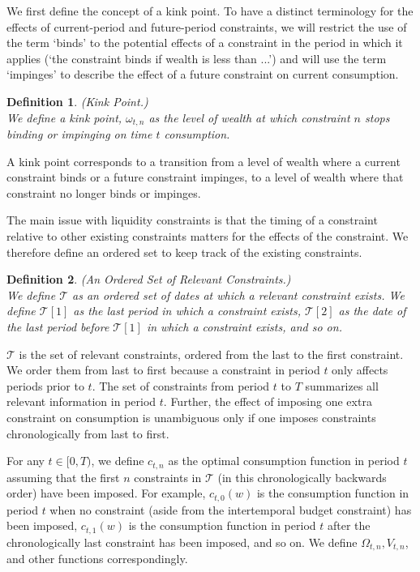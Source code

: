 \documentclass[titlepage]{\econtex}
\providecommand{\wAlt}{\omega}
\newtheorem{defn}{Definition}
\begin{document}
  We first define the concept of a kink point. To have a distinct terminology for the effects of current-period and future-period constraints, we will restrict the use of the term `binds' to the potential effects of a constraint in the period in which it applies (`the constraint binds if wealth is less than ...') and will use the term `impinges' to describe the effect of a future constraint on current consumption. 
  \begin{defn}(Kink Point.) \\
    We define a kink point, $\wAlt_{t,n}$ as the level of wealth at which constraint $n$ stops binding or impinging on time $t$ consumption.
  \end{defn}
  \noindent A kink point corresponds to a transition from a level of wealth where a current constraint binds or a future constraint impinges, to a level of wealth where that constraint no longer binds or impinges. 





  The main issue with liquidity constraints is that the timing of a constraint relative to  other existing constraints matters for the effects of the constraint. We therefore define an ordered set to keep track of the existing constraints.
  \begin{defn} (An Ordered Set of Relevant Constraints.) \\
    We define $\mathcal{T}$ as an ordered set of dates at which a relevant constraint exists. We define $\mathcal{T}[1]$ as the last period in which a constraint exists, $\mathcal{T}[2]$ as the date of the last period before $\mathcal{T}[1]$ in which a constraint exists, and so on.
  \end{defn}
  \noindent $\mathcal{T}$ is the set of relevant constraints, ordered from the last to the first constraint. We order them from last to first because a constraint in period $t$ only affects periods prior to $t$. The set of constraints from period $t$ to $T$ summarizes all relevant information in period $t$. Further, the effect of imposing one extra constraint on consumption is unambiguous only if one imposes constraints chronologically from last to first.

  For any $t \in [0, T)$, we define $c_{t,n}$ as the optimal consumption function in period $t$ assuming that the first $n$ constraints in $\mathcal{T}$ (in this chronologically backwards order) have been imposed. For example, $c_{t,0}(w)$ is the consumption function in period $t$ when no constraint (aside from the intertemporal budget constraint) has been imposed, $c_{t,1}(w)$ is the consumption function in period $t$ after the chronologically last constraint has been imposed, and so on. We define $\Omega_{t,n}, V_{t,n}$, and other functions correspondingly.
\end{document}
